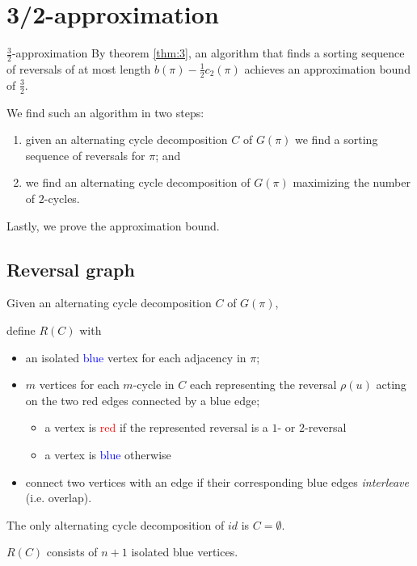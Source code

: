 \documentclass{beamer}
\theoremstyle{definition}
\def\spadding{\vspace{0.25cm}}
\def\b{\textcolor{blue}}
\def\r{\textcolor{red}}
\begin{document}
\section{3/2-approximation}

\begin{frame}

\begin{block}{$\frac{3}{2}$-approximation}
By theorem \ref{thm:3}, an algorithm that finds a sorting sequence of reversals of at most length $b(\pi) - \frac{1}{2} c_2(\pi)$ achieves an approximation bound of $\frac{3}{2}$. \pause\spadding

We find such an algorithm in two steps:
\begin{enumerate}
    \item given an alternating cycle decomposition $C$ of $G(\pi)$ we find a sorting sequence of reversals for $\pi$\pause; and
    \item we find an alternating cycle decomposition of $G(\pi)$ maximizing the number of $2$-cycles.
\end{enumerate}
\end{block}\pause

Lastly, we prove the approximation bound.

\end{frame}

\subsection{Reversal graph}

\begin{frame}

\begin{definition}
Given an alternating cycle decomposition $C$ of $G(\pi)$, \par\pause
define $R(C)$ with
\begin{itemize}
    \item an isolated \b{blue} vertex for each adjacency in $\pi$\pause;
    \item $m$ vertices for each $m$-cycle in $C$ each representing the reversal $\rho(u)$ acting on the two red edges connected by a blue edge\pause;
    \begin{itemize}
        \item a vertex is \r{red} if the represented reversal is a $1$- or $2$-reversal
        \item a vertex is \b{blue} otherwise
    \end{itemize}\pause
    \item connect two vertices with an edge if their corresponding blue edges \textit{interleave} (i.e. overlap).
\end{itemize}
\end{definition}\pause

\begin{corollary}
The only alternating cycle decomposition of $id$ is $C = \emptyset$. \par
$R(C)$ consists of $n+1$ isolated blue vertices.
\end{corollary}

\end{frame}
\end{document}
